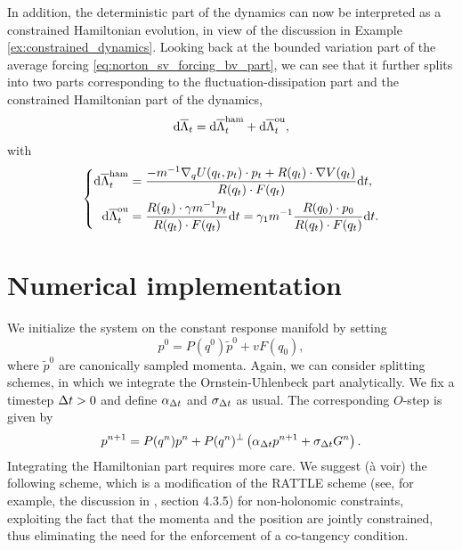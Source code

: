 In addition, the deterministic part of the dynamics can now be interpreted as a constrained Hamiltonian evolution, in view of the discussion in Example \ref{ex:constrained_dynamics}.
Looking back at the bounded variation part of the average forcing \eqref{eq:norton_sv_forcing_bv_part}, we can see that it further splits into two parts corresponding to the fluctuation-dissipation part and the constrained Hamiltonian part of the dynamics,
\[\mathrm{d} \overline{\Lambda}_t =\mathrm{d} \overline{\Lambda}^{\mathrm{ham}}_t+\mathrm{d} \overline{\Lambda}^{\mathrm{ou}}_t,\]
with
\begin{equation}\left\{\begin{aligned}
    \mathrm{d} \overline{\Lambda}_t^{\mathrm{ham}}&=\frac{-m^{-1}\nabla_q U(q_t,p_t)\cdot p_t +R(q_t)\cdot\nabla V(q_t)}{R(q_t)\cdot F(q_t)}\mathrm{d} t,\\
    \mathrm{d} \overline{\Lambda}_t^{\mathrm{ou}}&=\frac{R(q_t)\cdot\gamma m^{-1}p_t}{R(q_t)\cdot F(q_t)}\mathrm{d} t=\gamma_1m^{-1}\frac{R(q_0)\cdot p_0}{R(q_t)\cdot F(q_t)}\mathrm{d} t.
\end{aligned}\right.
\end{equation}

\section{Numerical implementation}
We initialize the system on the constant response manifold by setting 
\[p^0=P(q^0)\tilde{p}^0+vF(q_0),\]
where $\tilde p^0$ are canonically sampled momenta.
Again, we can consider splitting schemes, in which we integrate the Ornstein-Uhlenbeck part analytically. We fix a timestep ${\Delta t}>0$ and define $\alpha_{{\Delta t}}$ and $\sigma_{{\Delta t}}$ as usual.
The corresponding $O$-step is given by
    \begin{equation}
        \label{eq:norton_sv_o_step}
            p^{n+1}=P(q^n)p^n+P(q^n)^\perp\left(\alpha_{\Delta t}p^{n+1}+\sigma_{\Delta t}G^{n}\right).\\
    \end{equation}
Integrating the Hamiltonian part requires more care. We suggest (à voir) the following scheme, which is a modification of the RATTLE scheme (see, for example, the discussion in \cite{LM15}, section 4.3.5) for non-holonomic constraints,
exploiting the fact that the momenta and the position are jointly constrained, thus eliminating the need for the enforcement of a co-tangency condition.

